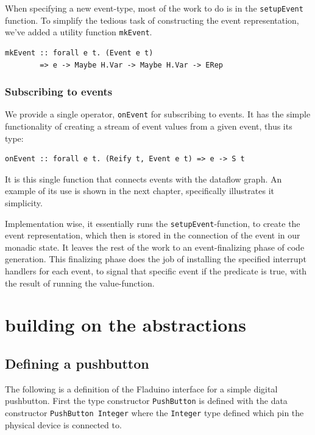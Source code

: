 \documentclass[a4paper, oneside, final]{memoir}
\let\Fref\undefined
\begin{document}
When specifying a new event-type, most of the work to do is in the
\verb|setupEvent| function. To simplify the tedious task
of constructing the event representation, we've added a utility
function \verb|mkEvent|. 
\begin{verbatim}
mkEvent :: forall e t. (Event e t) 
        => e -> Maybe H.Var -> Maybe H.Var -> ERep
\end{verbatim}

\subsection{Subscribing to events}
We provide a single operator, \verb|onEvent| for subscribing to
events. It has the simple functionality of creating a stream of event
values from a given event, thus its type:

\begin{verbatim}
onEvent :: forall e t. (Reify t, Event e t) => e -> S t
\end{verbatim}

\noindent
It is this single function that connects events with the dataflow
graph. An example of its use is shown in the next chapter,
specifically \Fref{fig:onEvent usage} illustrates it simplicity.

Implementation wise, it essentially runs the
\verb|setupEvent|-function, to create the event representation, which
then is stored in the connection of the event in our monadic state.
It leaves the rest of the work to an event-finalizing phase of code
generation.  This finalizing phase does the job of installing the
specified interrupt handlers for each event, to signal that specific
event if the predicate is true, with the result of running the
value-function.


\chapter{building on the abstractions}

\section{Defining a pushbutton}
\label{sec:pushbuttondef}
The following is a definition of the Fladuino interface for a simple digital
pushbutton. First the type constructor \texttt{PushButton} is defined with the
data constructor \texttt{PushButton Integer} where the \texttt{Integer} type
defined which pin the physical device is connected to.
\end{document}
